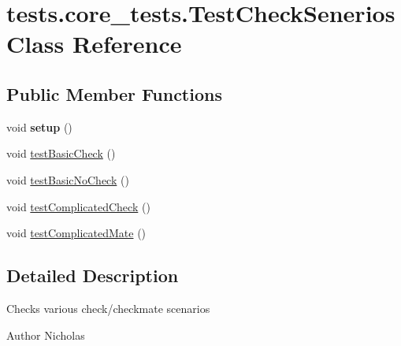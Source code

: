 \hypertarget{classtests_1_1core__tests_1_1_test_check_senerios}{\section{tests.\-core\-\_\-tests.\-Test\-Check\-Senerios Class Reference}
\label{classtests_1_1core__tests_1_1_test_check_senerios}
}
\subsection*{Public Member Functions}
\begin{DoxyCompactItemize}
\item 
\hypertarget{classtests_1_1core__tests_1_1_test_check_senerios_aa981055645645028d13db1f3c5d850ac}{void {\bfseries setup} ()}\label{classtests_1_1core__tests_1_1_test_check_senerios_aa981055645645028d13db1f3c5d850ac}

\item 
void \hyperlink{classtests_1_1core__tests_1_1_test_check_senerios_aefce5843fbe7952185c64888b1230bd3}{test\-Basic\-Check} ()
\item 
void \hyperlink{classtests_1_1core__tests_1_1_test_check_senerios_a36b95cc47e92104189d6e1829488b002}{test\-Basic\-No\-Check} ()
\item 
void \hyperlink{classtests_1_1core__tests_1_1_test_check_senerios_a0538efdd54699e0b81cea9af1af80d54}{test\-Complicated\-Check} ()
\item 
void \hyperlink{classtests_1_1core__tests_1_1_test_check_senerios_a12554781faa512dd4b086263778e537b}{test\-Complicated\-Mate} ()
\end{DoxyCompactItemize}


\subsection{Detailed Description}
Checks various check/checkmate scenarios

\begin{DoxyAuthor}{Author}
Nicholas 
\end{DoxyAuthor}


